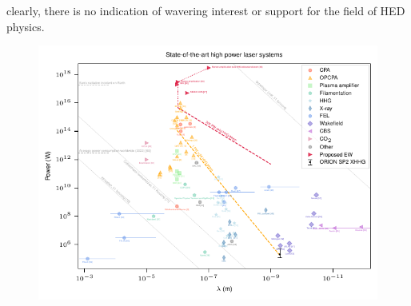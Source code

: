 clearly, there is no indication of wavering interest or support for the field of \ac{HED} physics. 
\begin{figure}
	\centering
	\includegraphics[width=\linewidth]{figures/intro/laser_systems}

\end{figure}
